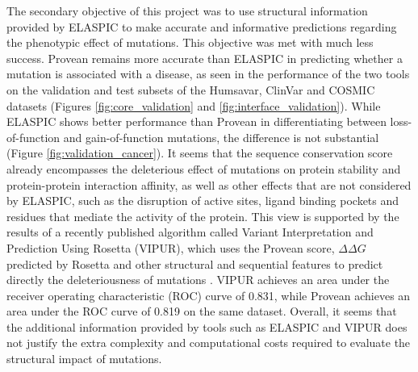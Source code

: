 The secondary objective of this project was to use structural information provided by ELASPIC to make accurate and informative predictions regarding the phenotypic effect of mutations. This objective was met with much less success. Provean remains more accurate than ELASPIC in predicting whether a mutation is associated with a disease, as seen in the performance of the two tools on the validation and test subsets of the Humsavar, ClinVar and COSMIC datasets (Figures \ref{fig:core_validation} and \ref{fig:interface_validation}). While ELASPIC shows better performance than Provean in differentiating between loss-of-function and gain-of-function mutations, the difference is not substantial (Figure  \ref{fig:validation_cancer}).  It seems that the sequence conservation score already encompasses the deleterious effect of mutations on protein stability and protein-protein interaction affinity, as well as other effects that are not considered by ELASPIC, such as the disruption of active sites, ligand binding pockets and residues that mediate the activity of the protein. This view is supported by the results of a recently published algorithm called Variant Interpretation and Prediction Using Rosetta (VIPUR), which uses the Provean score, $\Delta \Delta G$ predicted by Rosetta and other structural and sequential features to predict directly the deleteriousness of mutations \cite{baugh_robust_2016}. VIPUR achieves an area under the receiver operating characteristic (ROC) curve of 0.831, while Provean achieves an area under the ROC curve of 0.819 on the same dataset. Overall, it seems that the additional information provided by tools such as ELASPIC and VIPUR does not justify the extra complexity and computational costs required to evaluate the structural impact of mutations.

